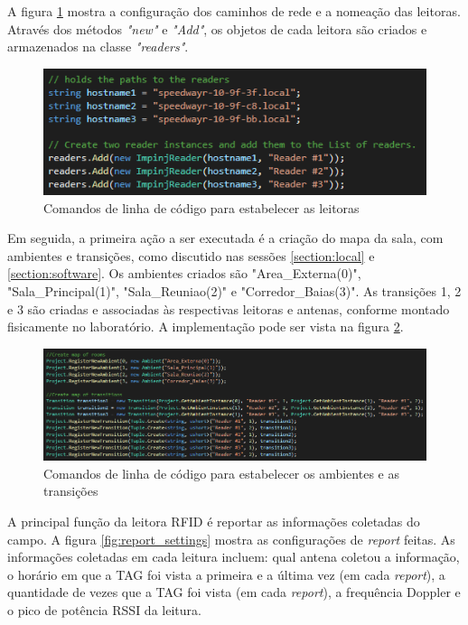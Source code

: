   A figura \ref{fig:set_readers} mostra a configuração dos caminhos de rede e a nomeação das leitoras. Através dos métodos \textit{"new"} e \textit{"Add"}, os objetos de cada leitora são criados e armazenados na classe \textit{"readers"}.

 \begin{figure}[H]
    \centering
    \includegraphics[width=0.8\linewidth]{figs/Metodologia/set_readers.PNG}
    \caption{Comandos de linha de código para estabelecer as leitoras}
    \label{fig:set_readers}
\end{figure}

 Em seguida, a primeira ação a ser executada é a criação do mapa da sala, com ambientes e transições, como discutido nas sessões \ref{section:local} e \ref{section:software}. Os ambientes criados são "Area\_Externa(0)", "Sala\_Principal(1)", "Sala\_Reuniao(2)" e "Corredor\_Baias(3)". As transições 1, 2 e 3 são criadas e associadas às respectivas leitoras e antenas, conforme montado fisicamente no laboratório. A implementação pode ser vista na figura \ref{fig:set_AmbTran}.

 \begin{figure}[H]
    \centering
    \includegraphics[width=1\linewidth]{figs/Metodologia/set_rooms&transitions.PNG}
    \caption{Comandos de linha de código para estabelecer os ambientes e as transições}
    \label{fig:set_AmbTran}
\end{figure}

  A principal função da leitora RFID é reportar as informações coletadas do campo. A figura \ref{fig:report_settings} mostra as configurações de \textit{report} feitas. As informações coletadas em cada leitura incluem: qual antena coletou a informação, o horário em que a TAG foi vista a primeira e a última vez (em cada \textit{report}), a quantidade de vezes que a TAG foi vista (em cada \textit{report}), a frequência Doppler e o pico de potência RSSI da leitura. 
  
